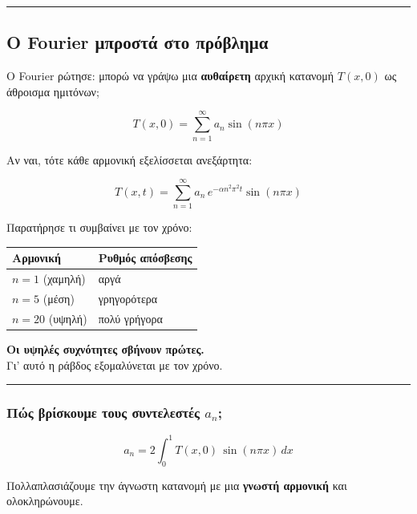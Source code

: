\documentclass[a4paper, 11pt]{article}
\begin{document}
\begin{center}\rule{0.5\linewidth}{0.5pt}\end{center}

\subsection{Ο Fourier μπροστά στο
πρόβλημα}\label{ux3bf-fourier-ux3bcux3c0ux3c1ux3bfux3c3ux3c4ux3ac-ux3c3ux3c4ux3bf-ux3c0ux3c1ux3ccux3b2ux3bbux3b7ux3bcux3b1}

Ο Fourier ρώτησε: μπορώ να γράψω μια \textbf{αυθαίρετη} αρχική κατανομή
\(T(x, 0)\) ως άθροισμα ημιτόνων;

\[T(x, 0) = \sum_{n=1}^{\infty} a_n \sin(n\pi x)\]

Αν ναι, τότε κάθε αρμονική εξελίσσεται ανεξάρτητα:

\[T(x, t) = \sum_{n=1}^{\infty} a_n \, e^{-\alpha n^2 \pi^2 t} \sin(n\pi x)\]

Παρατήρησε τι συμβαίνει με τον χρόνο:

\begin{longtable}[]{@{}ll@{}}
\toprule\noalign{}
Αρμονική & Ρυθμός απόσβεσης \\
\midrule\noalign{}
\endhead
\bottomrule\noalign{}
\endlastfoot
\(n=1\) (χαμηλή) & αργά \\
\(n=5\) (μέση) & γρηγορότερα \\
\(n=20\) (υψηλή) & πολύ γρήγορα \\
\end{longtable}

\textbf{Οι υψηλές συχνότητες σβήνουν πρώτες.}\\
Γι' αυτό η ράβδος εξομαλύνεται με τον χρόνο.

\begin{center}\rule{0.5\linewidth}{0.5pt}\end{center}

\subsubsection{\texorpdfstring{Πώς βρίσκουμε τους συντελεστές
\(a_n\);}{Πώς βρίσκουμε τους συντελεστές a\_n;}}\label{ux3c0ux3ceux3c2-ux3b2ux3c1ux3afux3c3ux3baux3bfux3c5ux3bcux3b5-ux3c4ux3bfux3c5ux3c2-ux3c3ux3c5ux3bdux3c4ux3b5ux3bbux3b5ux3c3ux3c4ux3adux3c2-a_n}

\[a_n = 2\int_0^1 T(x,0)\,\sin(n\pi x)\,dx\]

Πολλαπλασιάζουμε την άγνωστη κατανομή με μια \textbf{γνωστή αρμονική}
και ολοκληρώνουμε.
\end{document}

